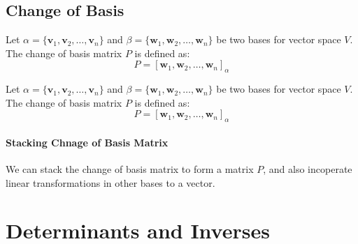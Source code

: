 \documentclass[11pt]{article}
\begin{document}
\subsection{Change of Basis}
\begin{definition}
    Let $\alpha = \{\textbf{v}_1, \textbf{v}_2, \ldots, \textbf{v}_n\}$ and $\beta = \{\textbf{w}_1, \textbf{w}_2, \ldots, \textbf{w}_n\}$ be two bases for vector space $V$. The change of basis matrix $P$ is defined as:
    \begin{equation}
        P = [\textbf{w}_1, \textbf{w}_2, \ldots, \textbf{w}_n]_\alpha
    \end{equation}
\end{definition}
\begin{theorem}
    Let $\alpha = \{\textbf{v}_1, \textbf{v}_2, \ldots, \textbf{v}_n\}$ and $\beta = \{\textbf{w}_1, \textbf{w}_2, \ldots, \textbf{w}_n\}$ be two bases for vector space $V$. The change of basis matrix $P$ is defined as:
    \begin{equation}
        P = [\textbf{w}_1, \textbf{w}_2, \ldots, \textbf{w}_n]_\alpha
    \end{equation}
\end{theorem}
\paragraph{Stacking Chnage of Basis Matrix} We can stack the change of basis matrix to form a matrix $P$, and also incoperate linear transformations in other bases to a vector.
\section{Determinants and Inverses}
\end{document}
